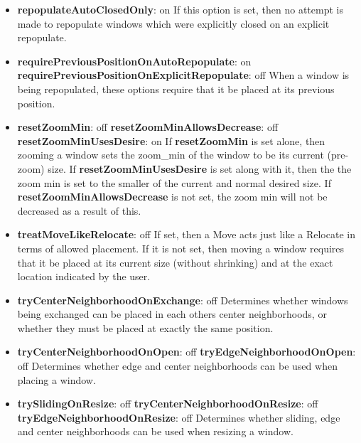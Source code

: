 \begin{itemize}
\item {\bf repopulateAutoClosedOnly}: on\newline{}
If this option is set, then no attempt is made to repopulate
windows which were explicitly closed on an explicit repopulate.

\item {\bf requirePreviousPositionOnAutoRepopulate}: on\newline{}
{\bf requirePreviousPositionOnExplicitRepopulate}: off\newline{}
When a window is being repopulated, these options require that it
be placed at its previous position.

\item {\bf resetZoomMin}: off\newline{}
{\bf resetZoomMinAllowsDecrease}: off\newline{}
{\bf resetZoomMinUsesDesire}: on\newline{}
If {\bf resetZoomMin} is set alone, then zooming a window sets the
zoom\_min of the window to be its current (pre-zoom) size.
If {\bf resetZoomMinUsesDesire} is set along with it, then the
the zoom min is set to the smaller of the current and
normal desired size.
If {\bf resetZoomMinAllowsDecrease} is not set, the zoom min will
not be decreased as a result of this.

\item {\bf treatMoveLikeRelocate}: off\newline{}
If set, then a Move acts just like a Relocate in terms of allowed
placement.  If it is not set, then moving a window requires that
it be placed at its current size (without shrinking) and at the
exact location indicated by the user.

\item {\bf tryCenterNeighborhoodOnExchange}: off\newline{}
Determines whether windows being exchanged can be placed in
each others center neighborhoods, or whether they must be placed at
exactly the same position.

\item {\bf tryCenterNeighborhoodOnOpen}: off\newline{}
{\bf tryEdgeNeighborhoodOnOpen}: off\newline{}
Determines whether edge and center neighborhoods can be used when
placing a window.

\item {\bf trySlidingOnResize}: off\newline{}
{\bf tryCenterNeighborhoodOnResize}: off\newline{}
{\bf tryEdgeNeighborhoodOnResize}: off\newline{}
Determines whether sliding, edge and center neighborhoods can be
used when resizing a window.


\end{itemize}
